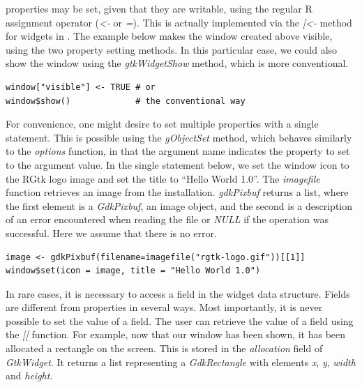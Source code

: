 \documentclass[article]{jss}
\begin{document}
 properties may be set, given that they are writable, using
the regular R assignment operator (\emph{<-} or \emph{=}). This is
actually implemented via the \emph{[<-} method for  widgets
in . The example below makes the window created above
visible, using the two property setting methods. In this particular
case, we could also show the window using the \emph{gtkWidgetShow}
method, which is more conventional.
\begin{verbatim}
window["visible"] <- TRUE # or
window$show()             # the conventional way
\end{verbatim}

For convenience, one might desire to set multiple properties with a
single statement.
This is possible using the \emph{gObjectSet} method, which behaves
similarly
to the  \emph{options} function, in that the argument name
indicates
the property to set to the argument value. 
In the single statement below, we 
set the window icon to the RGtk logo image and set the title to
``Hello World 1.0''. 
The \emph{imagefile} function retrieves an image from the 
installation.
\emph{gdkPixbuf} returns a list, where the first element is a
\emph{GdkPixbuf}, an image object,
and the second is a description of an error encountered when reading
the file
or \emph{NULL} if the operation was successful. Here we assume that
there is no error.
\begin{verbatim}
image <- gdkPixbuf(filename=imagefile("rgtk-logo.gif"))[[1]]
window$set(icon = image, title = "Hello World 1.0")
\end{verbatim}

In rare cases, it is necessary to access a field in the widget data
structure.
Fields are different from properties in several ways. Most
importantly, it is
never possible to set the value of a field. The user can retrieve the
value of
a field using the \emph{[[} function. For example, now that our window
has been shown, it has been allocated a rectangle on the screen. This
is stored
in the \emph{allocation} field of \emph{GtkWidget}. It returns a list 
representing a \emph{GdkRectangle} with
elements \emph{x}, \emph{y}, \emph{width} and \emph{height}.

\end{document}
